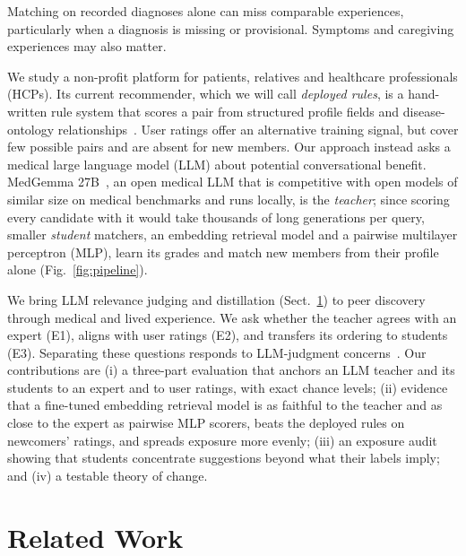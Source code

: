 \documentclass[runningheads,a4paper]{llncs}
\begin{document}
Matching on recorded diagnoses alone can miss comparable experiences,
particularly when a diagnosis is missing or provisional. Symptoms and
caregiving experiences may also matter.

We study a non-profit platform for patients, relatives and healthcare
professionals (HCPs). Its current recommender, which we will call \emph{deployed rules}, is a
hand-written rule system that scores a pair from structured profile fields and
disease-ontology relationships~\cite{fendrich2026development,berger2024tackling}. User ratings offer an alternative
training signal, but cover few possible pairs and are absent for new members.
Our approach instead asks a medical large language model (LLM) about potential
conversational benefit. MedGemma 27B~\cite{sellergren2025medgemma}, an open medical LLM that is competitive
with open models of similar size on medical benchmarks and runs locally, is the \emph{teacher};
since scoring every candidate with it would take thousands of
long generations per query, smaller \emph{student} matchers, an embedding retrieval model and a
pairwise multilayer perceptron (MLP), learn its grades
and match new members from their profile alone (Fig.~\ref{fig:pipeline}).



We bring LLM relevance judging and distillation (Sect.~\ref{sec:related}) to peer
discovery through medical and lived experience.
We ask whether the teacher agrees with an expert (E1), aligns with user ratings
(E2), and transfers its ordering to students (E3). Separating these questions
responds to LLM-judgment concerns~\cite{faggioli2023perspectives,dietz2025judges}.
Our contributions are (i) a three-part evaluation that anchors an LLM teacher
and its students to an expert and to user ratings, with exact chance levels;
(ii) evidence that a fine-tuned embedding retrieval model is as faithful to the teacher and as
close to the expert as pairwise MLP scorers, beats the deployed rules on newcomers'
ratings, and spreads exposure more evenly; (iii) an exposure
audit showing that students concentrate suggestions beyond what their labels
imply; and (iv) a testable theory of change.

\section{Related Work}
\label{sec:related}
\end{document}
